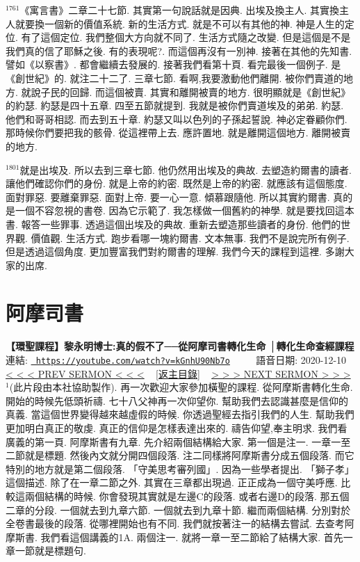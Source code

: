 \documentclass{book}
\begin{document}
$^{1761}$《寓言書》二章二十七節.
其實第一句說話就是因典.
出埃及換主人.
其實換主人就要換一個新的價值系統.
新的生活方式.
就是不可以有其他的神.
神是人生的定位.
有了這個定位.
我們整個大方向就不同了.
生活方式隨之改變.
但是這個是不是我們真的信了耶穌之後.
有的表現呢?.
而這個再沒有一別神.
接著在其他的先知書.
譬如《以察書》.
都會繼續去發展的.
接著我們看第十頁.
看完最後一個例子.
是《創世紀》的.
就注二十二了.
三章七節.
看啊,我要激動他們離開.
被你們賣道的地方.
就說子民的回歸.
而這個被賣.
其實和離開被賣的地方.
很明顯就是《創世紀》的約瑟.
約瑟是四十五章.
四至五節就提到.
我就是被你們賣道埃及的弟弟.
約瑟.
他們和哥哥相認.
而去到五十章.
約瑟又叫以色列的子孫起誓說.
神必定眷顧你們.
那時候你們要把我的骸骨.
從這裡帶上去.
應許置地.
就是離開這個地方.
離開被賣的地方.

$^{1801}$就是出埃及.
所以去到三章七節.
他仍然用出埃及的典故.
去塑造約爾書的讀者.
讓他們確認你們的身份.
就是上帝的約密.
既然是上帝的約密.
就應該有這個態度.
面對罪惡.
要離棄罪惡.
面對上帝.
要一心一意.
傾慕跟隨他.
所以其實約爾書.
真的是一個不容忽視的書卷.
因為它示範了.
我怎樣做一個舊約的神學.
就是要找回這本書.
報答一些罪事.
透過這個出埃及的典故.
重新去塑造那些讀者的身份.
他們的世界觀.
價值觀.
生活方式.
跑步看哪一塊約爾書.
文本無事.
我們不是說完所有例子.
但是透過這個角度.
更加豐富我們對約爾書的理解.
我們今天的課程到這裡.
多謝大家的出席.
\newpage



\section{阿摩司書}
\label{sec:kGnhU90Nb7o}
\textbf{【環聖課程】黎永明博士:真的假不了──從阿摩司書轉化生命 │轉化生命查經課程}
\newline
\newline
連結: \href{https://youtube.com/watch?v=kGnhU90Nb7o}{\texttt{ https://youtube.com/watch?v=kGnhU90Nb7o}} ~~~~ 語音日期: 2020-12-10 
\newline
\newline
\hyperref[sec:ovzkHTnXBCk]{\small{< < < PREV SERMON < < <}}
~
\hyperref[sec:index]{\small{[返主目錄]}}
~
\hyperref[sec:WqYP3WEeIPg]{\small{> > > NEXT SERMON > > >}}
\newline
\newline
$^{1}$(此片段由本社協助製作).
再一次歡迎大家參加橫聖的課程.
從阿摩斯書轉化生命.
開始的時候先低頭祈禱.
七十八父神再一次仰望你.
幫助我們去認識甚麼是信仰的真義.
當這個世界變得越來越虛假的時候.
你透過聖經去指引我們的人生.
幫助我們更加明白真正的敬虔.
真正的信仰是怎樣表達出來的.
禱告仰望,奉主明求.
我們看廣義的第一頁.
阿摩斯書有九章.
先介紹兩個結構給大家.
第一個是注一.
一章一至二節就是標題.
然後內文就分開四個段落.
注二同樣將阿摩斯書分成五個段落.
而它特別的地方就是第二個段落.
「守美思考審列國」.
因為一些學者提出.
「獅子孝」這個描述.
除了在一章二節之外.
其實在三章都出現過.
正正成為一個守美呼應.
比較這兩個結構的時候.
你會發現其實就是左邊C的段落.
或者右邊D的段落.
那五個二章的分段.
一個就去到九章六節.
一個就去到九章十節.
繼而兩個結構.
分別對於全卷書最後的段落.
從哪裡開始也有不同.
我們就按著注一的結構去嘗試.
去查考阿摩斯書.
我們看這個講義的1A.
兩個注一.
就將一章一至二節給了結構大家.
首先一章一節就是標題句.
\end{document}
